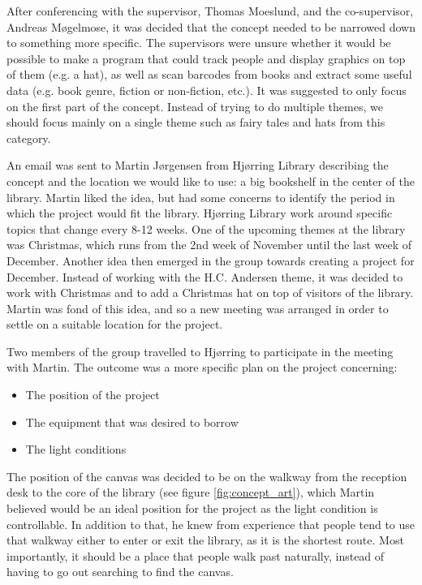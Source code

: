 After conferencing with the supervisor, Thomas Moeslund, and the co-supervisor, Andreas M{\o}gelmose, it was decided that the concept needed to be narrowed down to something more specific. The supervisors were unsure whether it would be possible to make a program that could  track people and display graphics on top of them (e.g. a hat), as well as scan barcodes from books and extract some useful data (e.g. book genre, fiction or non-fiction, etc.). It was suggested to only focus on the first part of the concept. Instead of trying to do multiple themes, we should focus mainly on a single theme such as fairy tales and hats from this category.

An email was sent to Martin J{\o}rgensen from Hj{\o}rring Library describing the concept and the location we would like to use: a big bookshelf in the center of the library. Martin liked the idea, but had some concerns to identify the period in which the project would fit the library. Hj{\o}rring Library work around specific topics that change every 8-12 weeks. One of the upcoming themes at the library was Christmas, which runs from the 2nd week of November until the last week of December. Another idea then emerged in the group towards creating a project for December. Instead of working with the H.C. Andersen theme, it was decided to work with Christmas and to add a Christmas hat on top of visitors of the library. Martin was fond of this idea, and so a new meeting was arranged in order to settle on a suitable location for the project.

Two members of the group travelled to Hj{\o}rring to participate in the meeting with Martin. The outcome was a more specific plan on the project concerning:

\begin{itemize}
\item The position of the project
\item The equipment that was desired to borrow
\item The light conditions
\end{itemize}

The position of the canvas was decided to be on the walkway from the reception desk to the core of the library (see figure \ref{fig:concept_art}), which Martin believed would be an ideal position for the project as the light condition is controllable. In addition to that, he knew from experience that people tend to use that walkway either to enter or exit the library, as it is the shortest route. Most importantly, it should be a place that people walk past naturally, instead of having to go out searching to find the canvas.


